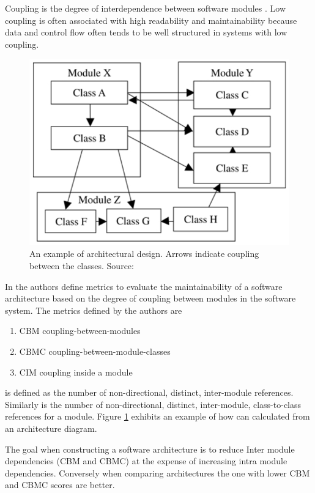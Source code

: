 \documentclass[15pt]{article}
\begin{document}
Coupling is the degree of interdependence between software modules \cite{iso_international_2006}. Low coupling is often associated with high readability and maintainability because data and control flow often tends to be well structured in systems with low coupling.\\

\begin{figure}
	\includegraphics[width=0.9\linewidth]{./coupling}
	\caption{An example of architectural design.
	Arrows indicate coupling between the classes. Source:\cite{lindvall_empirically-based_2003}}
	\label{fig:coupling}
\end{figure}


In \cite{lindvall_empirically-based_2003} the authors define metrics to evaluate the maintainability of a software architecture based on the degree of coupling between modules in the software system. The metrics defined by the authors are
\begin{enumerate}
\item CBM coupling-between-modules
\item CBMC coupling-between-module-classes
\item CIM coupling inside a module
\end{enumerate}

 is defined as the number of non-directional, distinct, inter-module references. Similarly  is the number of non-directional, distinct, inter-module, class-to-class references for a module. Figure \ref{fig:coupling} exhibits an example of how  can calculated from an architecture diagram.

The goal when constructing a software architecture is to reduce Inter module dependencies (CBM and CBMC) at the expense of increasing intra module dependencies. Conversely when comparing architectures the one with lower CBM and CBMC scores are better.
\end{document}
